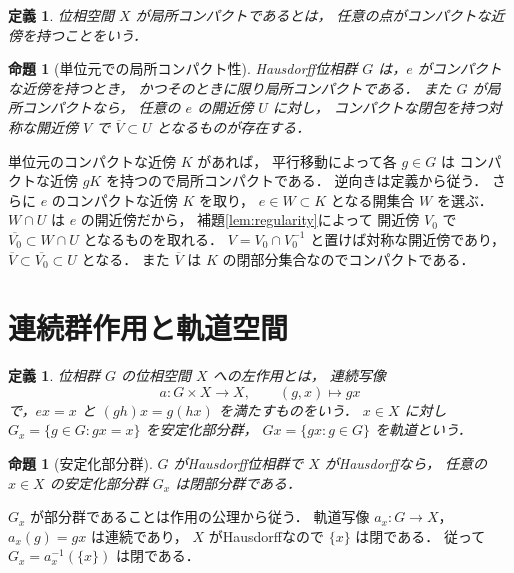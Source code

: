 \documentclass[a5paper,10pt,onecolumn]{jsarticle}
\makeatletter
\theoremstyle{mathnotetheorem}
\newtheorem{definition}[theorem]{定義}
\newtheorem{proposition}[theorem]{命題}
\renewcommand{\proofname}{証明}
\renewenvironment{proof}[1][\proofname]{%
  \par\pushQED{\qed}\normalfont\topsep4\p@\@plus2\p@\relax
  \trivlist\item[\hskip\labelsep\bfseries #1]\ignorespaces
}{\popQED\endtrivlist\@endpefalse}
\makeatother
\begin{document}
\begin{definition}
位相空間 $X$ が\emph{局所コンパクト}であるとは，
任意の点がコンパクトな近傍を持つことをいう．
\end{definition}

\begin{proposition}[単位元での局所コンパクト性]\label{prop:local-compact}
Hausdorff位相群 $G$ は，$e$ がコンパクトな近傍を持つとき，
かつそのときに限り局所コンパクトである．
また $G$ が局所コンパクトなら，
任意の $e$ の開近傍 $U$ に対し，
コンパクトな閉包を持つ対称な開近傍 $V$ で
$\overline V\subset U$ となるものが存在する．
\end{proposition}
\begin{proof}
単位元のコンパクトな近傍 $K$ があれば，
平行移動によって各 $g\in G$ は
コンパクトな近傍 $gK$ を持つので局所コンパクトである．
逆向きは定義から従う．
さらに $e$ のコンパクトな近傍 $K$ を取り，
$e\in W\subset K$ となる開集合 $W$ を選ぶ．
$W\cap U$ は $e$ の開近傍だから，
補題\ref{lem:regularity}によって
開近傍 $V_0$ で $\overline{V_0}\subset W\cap U$ となるものを取れる．
$V=V_0\cap V_0^{-1}$ と置けば対称な開近傍であり，
$\overline V\subset\overline{V_0}\subset U$ となる．
また $\overline V$ は $K$ の閉部分集合なのでコンパクトである．
\end{proof}

\section{連続群作用と軌道空間}

\begin{definition}
位相群 $G$ の位相空間 $X$ への\emph{左作用}とは，
連続写像
\[
 a:G\times X\to X,\qquad (g,x)\mapsto gx
\]
で，$ex=x$ と $(gh)x=g(hx)$ を満たすものをいう．
$x\in X$ に対し
$G_x=\{g\in G:gx=x\}$ を安定化部分群，
$Gx=\{gx:g\in G\}$ を軌道という．
\end{definition}

\begin{proposition}[安定化部分群]\label{prop:stabilizer}
$G$ がHausdorff位相群で $X$ がHausdorffなら，
任意の $x\in X$ の安定化部分群 $G_x$ は閉部分群である．
\end{proposition}
\begin{proof}
$G_x$ が部分群であることは作用の公理から従う．
軌道写像 $a_x:G\to X$，$a_x(g)=gx$ は連続であり，
$X$ がHausdorffなので $\{x\}$ は閉である．
従って $G_x=a_x^{-1}(\{x\})$ は閉である．
\end{proof}
\end{document}
